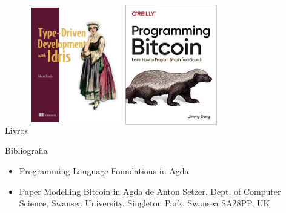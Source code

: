 \documentclass{beamer}
\begin{document}
 \begin{frame}{Livros}
    \includegraphics[width=4cm, height=6cm]{TDD}
    \includegraphics[width=4cm, height=6cm]{ProgrammingBitcoin.jpg}
 \end{frame}
 
 \begin{frame}{Bibliografia}
    \begin{itemize}
        \item Programming Language Foundations in Agda
        \item Paper Modelling Bitcoin in Agda de Anton Setzer.
        Dept. of Computer Science, Swansea University, Singleton Park, Swansea SA28PP, UK
    \end{itemize}
 \end{frame}
  
\end{document}
